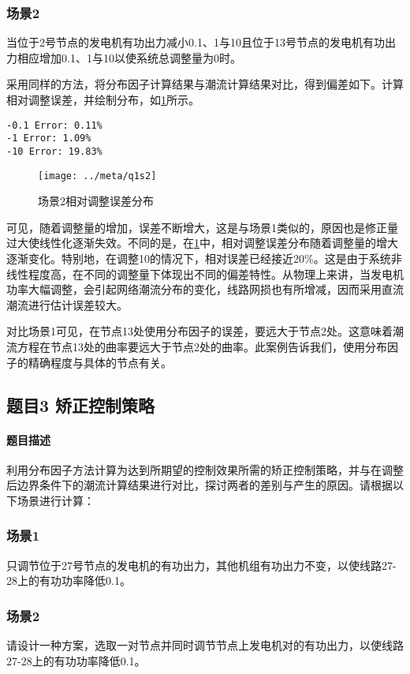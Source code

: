 \documentclass[a4paper,12pt]{article}
\begin{document}
    \subsubsection{场景2} 当位于2号节点的发电机有功出力减小0.1、1与10且位于13号节点的发电机有功出力相应增加0.1、1与10以使系统总调整量为0时。

    采用同样的方法，将分布因子计算结果与潮流计算结果对比，得到偏差如下。计算相对调整误差，并绘制分布，如\cref{fig:q1s2}所示。
    \begin{lstlisting}[style=Matlab-editor,basicstyle=\mlttfamily]
-0.1 Error: 0.11%
-1 Error: 1.09%
-10 Error: 19.83%
    \end{lstlisting}

    \begin{figure}[htbp]
      \texttt{[image: ../meta/q1s2]}
      \caption{场景2相对调整误差分布}
      \label{fig:q1s2}
    \end{figure}

    可见，随着调整量的增加，误差不断增大，这是与场景1类似的，原因也是修正量过大使线性化逐渐失效。不同的是，在\cref{fig:q1s2}中，相对调整误差分布随着调整量的增大逐渐变化。特别地，在调整10的情况下，相对误差已经接近20\%。这是由于系统非线性程度高，在不同的调整量下体现出不同的偏差特性。从物理上来讲，当发电机功率大幅调整，会引起网络潮流分布的变化，线路网损也有所增减，因而采用直流潮流进行估计误差较大。

    对比场景1可见，在节点13处使用分布因子的误差，要远大于节点2处。这意味着潮流方程在节点13处的曲率要远大于节点2处的曲率。此案例告诉我们，使用分布因子的精确程度与具体的节点有关。

    \subsection{题目3 矫正控制策略}
    \paragraph{题目描述} 利用分布因子方法计算为达到所期望的控制效果所需的矫正控制策略，并与在调整后边界条件下的潮流计算结果进行对比，探讨两者的差别与产生的原因。请根据以下场景进行计算：
    \subsubsection{场景1} 只调节位于27号节点的发电机的有功出力，其他机组有功出力不变，以使线路27-28上的有功功率降低0.1。
    \subsubsection{场景2} 请设计一种方案，选取一对节点并同时调节节点上发电机对的有功出力，以使线路27-28上的有功功率降低0.1。
\end{document}
